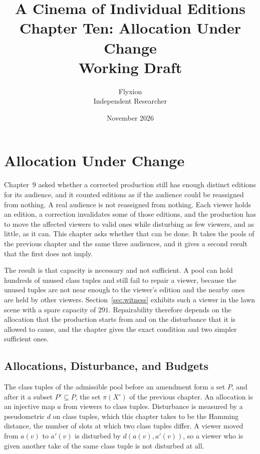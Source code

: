 \documentclass[11pt,twoside,openright]{book}
\title{\Huge\bfseries A Cinema of Individual Editions\\[1.2ex]
\large Chapter Ten: Allocation Under Change\\[0.4ex]
\large Working Draft}
\author{Flyxion\\[0.3ex]\small Independent Researcher}
\date{November 2026}
\theoremstyle{plain}
\theoremstyle{definition}
\theoremstyle{remark}
\begin{document}
\frontmatter
\maketitle
\tableofcontents
\mainmatter
\setcounter{chapter}{9}

\chapter{Allocation Under Change}
\label{ch:repair}

Chapter~9 asked whether a corrected production still has enough distinct editions for its audience, and it counted editions as if the audience could be reassigned from nothing. A real audience is not reassigned from nothing. Each viewer holds an edition, a correction invalidates some of those editions, and the production has to move the affected viewers to valid ones while disturbing as few viewers, and as little, as it can. This chapter asks whether that can be done. It takes the pools of the previous chapter and the same three audiences, and it gives a second result that the first does not imply.

The result is that capacity is necessary and not sufficient. A pool can hold hundreds of unused class tuples and still fail to repair a viewer, because the unused tuples are not near enough to the viewer's edition and the nearby ones are held by other viewers. Section~\ref{sec:witness} exhibits such a viewer in the lawn scene with a spare capacity of $291$. Repairability therefore depends on the allocation that the production starts from and on the disturbance that it is allowed to cause, and the chapter gives the exact condition and two simpler sufficient ones.

\section{Allocations, Disturbance, and Budgets}\label{sec:setting}

The class tuples of the admissible pool before an amendment form a set $P$, and after it a subset $P'\subseteq P$, the set $\pi(X')$ of the previous chapter. An allocation is an injective map $a$ from viewers to class tuples. Disturbance is measured by a pseudometric $d$ on class tuples, which this chapter takes to be the Hamming distance, the number of slots at which two class tuples differ. A viewer moved from $a(v)$ to $a'(v)$ is disturbed by $d(a(v),a'(v))$, so a viewer who is given another take of the same class tuple is not disturbed at all.
\end{document}
